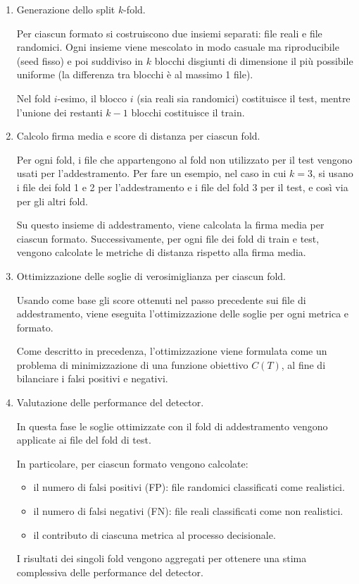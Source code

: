 \documentclass{report}
\begin{document}
\begin{enumerate}

\item {Generazione dello split \(k\)-fold}.

Per ciascun formato si
costruiscono due insiemi separati: file reali e file randomici.  
Ogni insieme viene mescolato in modo casuale ma riproducibile (seed fisso) e poi suddiviso
in \(k\) blocchi disgiunti di dimensione il più possibile uniforme (la differenza tra blocchi è al massimo 1 file).

Nel fold \(i\)-esimo, il blocco \(i\) (sia reali sia randomici) costituisce il test, mentre l’unione dei restanti \(k-1\) blocchi costituisce il train.

    \item {Calcolo firma media e score di distanza per ciascun fold}.

Per ogni fold, i file che appartengono al fold non utilizzato per il test vengono usati per l'addestramento.
Per fare un esempio, nel caso in cui \(k=3\), si usano i file dei fold 1 e 2 per l'addestramento e i file del fold 3 per il test,
e così via per gli altri fold.

Su questo insieme di addestramento, viene calcolata la firma media per ciascun formato.
Successivamente, per ogni file dei fold di train e test, vengono calcolate le metriche di distanza rispetto alla firma media.

    \item {Ottimizzazione delle soglie di verosimiglianza per ciascun fold}.

Usando come base gli score ottenuti nel passo precedente sui file di addestramento, viene eseguita 
l'ottimizzazione delle soglie per ogni metrica e formato.

Come descritto in precedenza, l'ottimizzazione viene formulata come un problema di minimizzazione di una funzione obiettivo \(C(T)\),
al fine di bilanciare i falsi positivi e negativi.

    \item {Valutazione delle performance del detector}.

In questa fase le soglie ottimizzate con il fold di addestramento vengono applicate ai file del fold di test.

In particolare, per ciascun formato vengono calcolate:
\begin{itemize}
        \item il numero di falsi positivi (FP): file randomici classificati come realistici.
        \item il numero di falsi negativi (FN): file reali classificati come non realistici.
        \item il contributo di ciascuna metrica al processo decisionale.
\end{itemize}

I risultati dei singoli fold vengono aggregati per ottenere una stima complessiva delle performance del detector.

\end{enumerate}
\end{document}
